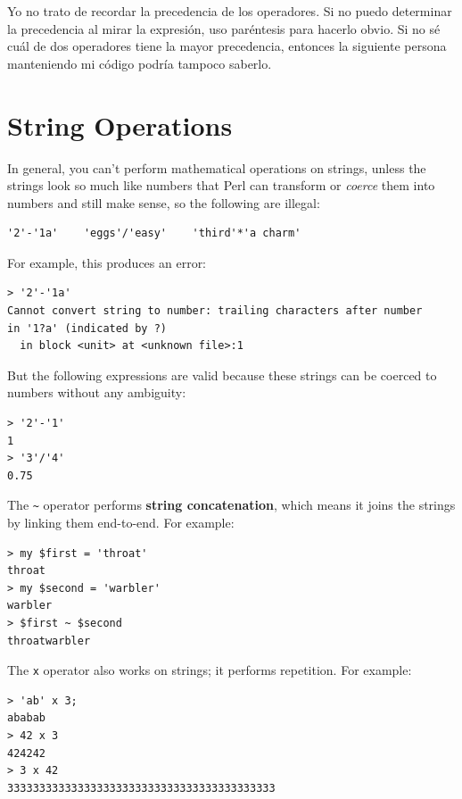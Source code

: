 Yo no trato de recordar la precedencia de los operadores. Si no puedo 
determinar la precedencia al mirar la expresión, uso paréntesis para
hacerlo obvio. Si no sé cuál de dos operadores tiene la mayor precedencia, entonces 
la siguiente persona manteniendo mi código podría tampoco saberlo.


\section{String Operations}
\label{string_operations}

In general, you can't perform mathematical operations on strings, unless
the strings look so much like numbers that Perl can transform or \emph{coerce} them into numbers and still make sense, so the 
following are illegal:

\begin{verbatim}
'2'-'1a'    'eggs'/'easy'    'third'*'a charm'
\end{verbatim}
%

For example, this produces an error:

\begin{verbatim}
> '2'-'1a'
Cannot convert string to number: trailing characters after number 
in '1?a' (indicated by ?)
  in block <unit> at <unknown file>:1
\end{verbatim}
%
  
But the following expressions are valid because these strings 
can be coerced to numbers without any ambiguity:
\begin{verbatim}
> '2'-'1'
1
> '3'/'4'
0.75
\end{verbatim}
%

The \verb'~' operator performs {\bf string concatenation}, which means
it joins the strings by linking them end-to-end.  For example:

\begin{verbatim}
> my $first = 'throat'
throat
> my $second = 'warbler'
warbler
> $first ~ $second
throatwarbler
\end{verbatim}
%
The {\tt x} operator also works on strings; it performs repetition.
For example:

\begin{verbatim}
> 'ab' x 3;
ababab
> 42 x 3
424242
> 3 x 42
333333333333333333333333333333333333333333
\end{verbatim}


